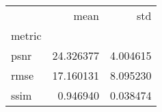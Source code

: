 \begin{tabular}{lrr}
\toprule
{} &       mean &       std \\
metric &            &           \\
\midrule
psnr   &  24.326377 &  4.004615 \\
rmse   &  17.160131 &  8.095230 \\
ssim   &   0.946940 &  0.038474 \\
\bottomrule
\end{tabular}
